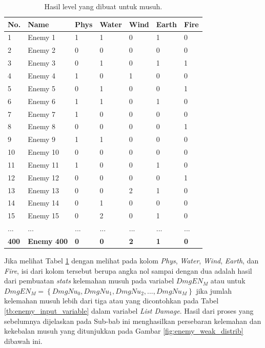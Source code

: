 \begin{table}[!h]
	\centering
	\caption{Hasil level yang dibuat untuk musuh.}
	\vspace{-2ex}
	\label{tb:enemy_weak_distrib}
	\begin{tabular}{|l|l|l|l|l|l|l|}
		\hline
		\textbf{No.} & \textbf{Name} & \textbf{Phys} & \textbf{Water} & \textbf{Wind} & \textbf{Earth} & \textbf{Fire} \\ \hline
		1 & Enemy 1 & 1 & 1 & 0 & 1 & 0 \\ \hline
		2 & Enemy 2 & 0 & 0 & 0 & 0 & 0 \\ \hline
		3 & Enemy 3 & 0 & 1 & 0 & 1 & 1 \\ \hline
		4 & Enemy 4 & 1 & 0 & 1 & 0 & 0 \\ \hline
		5 & Enemy 5 & 0 & 1 & 0 & 0 & 1 \\ \hline
		6 & Enemy 6 & 1 & 1 & 0 & 1 & 0 \\ \hline
		7 & Enemy 7 & 1 & 0 & 0 & 0 & 0 \\ \hline
		8 & Enemy 8 & 0 & 0 & 0 & 0 & 1 \\ \hline
		9 & Enemy 9 & 1 & 1 & 0 & 0 & 0 \\ \hline
		10 & Enemy 10 & 0 & 0 & 0 & 0 & 0 \\ \hline
		11 & Enemy 11 & 1 & 0 & 0 & 1 & 0 \\ \hline
		12 & Enemy 12 & 0 & 0 & 0 & 0 & 1 \\ \hline
		13 & Enemy 13 & 0 & 0 & 2 & 1 & 0 \\ \hline
		14 & Enemy 14 & 0 & 1 & 0 & 0 & 0 \\ \hline
		15 & Enemy 15 & 0 & 2 & 0 & 1 & 0 \\ \hline
		... & ... & ... & ... & ... & ... & ... \\ \hline
		\textbf{400} & \textbf{Enemy 400} & \textbf{0} & \textbf{0} & \textbf{2} & \textbf{1} & \textbf{0} \\ \hline
	\end{tabular}
\end{table}
\vspace{1ex}

Jika melihat Tabel \ref{tb:enemy_weak_distrib} dengan melihat pada kolom \textit{Phys}, \textit{Water}, \textit{Wind}, \textit{Earth}, dan \textit{Fire}, isi dari kolom tersebut berupa angka nol sampai dengan dua adalah hasil dari pembuatan \textit{stats} kelemahan musuh pada variabel $DmgEN_{M}$ atau untuk $DmgEN_{M} = \left \{ DmgNu_{0}, DmgNu_{1}, DmgNu_{2},..., DmgNu_{M} \right \}$ jika jumlah kelemahan musuh lebih dari tiga atau yang dicontohkan pada Tabel \ref{tb:enemy_input_variable} dalam variabel \textit{List Damage}. Hasil dari proses yang sebelumnya dijelaskan pada Sub-bab ini menghasilkan persebaran kelemahan dan kekebalan musuh yang ditunjukkan pada Gambar \ref{fig:enemy_weak_distrib} dibawah ini.


